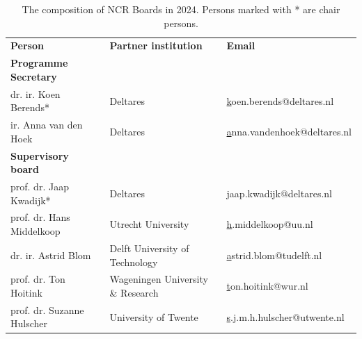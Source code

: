 \begin{longtable}{@{}lll@{}}
\caption{The composition of NCR Boards in 2024. Persons marked with * are chair persons.}\\


\rowcolor[HTML]{629194} 
{\color[HTML]{FFFFFF} \textbf{Person}} & {\color[HTML]{FFFFFF} \textbf{Partner   institution}} & {\color[HTML]{FFFFFF} \textbf{Email}}                        \\
\rowcolor[HTML]{C9D6D6} 
\textbf{Programme Secretary}           &                                                       &                                                              \\
\rowcolor[HTML]{B9C6D5} 
dr. ir. Koen Berends*                  & Deltares                                              & {\color[HTML]{0563C1} {\ul koen.berends@deltares.nl}}        \\
\rowcolor[HTML]{C9D6D6} 
ir. Anna van den Hoek                  & Deltares                                              & {\color[HTML]{0563C1} {\ul anna.vandenhoek@deltares.nl}}     \\
\rowcolor[HTML]{B9C6D5} 
\textbf{Supervisory board}             &                                                       &                                                              \\
\rowcolor[HTML]{C9D6D6} 
prof. dr. Jaap Kwadijk*                & Deltares                                              & {\color[HTML]{0563C1} {\ul jaap.kwadijk@deltares.nl}}        \\
\rowcolor[HTML]{B9C6D5} 
prof. dr. Hans Middelkoop              & Utrecht University                                    & {\color[HTML]{0563C1} {\ul h.middelkoop@uu.nl}}              \\
\rowcolor[HTML]{C9D6D6} 
dr. ir. Astrid Blom                    & Delft University of   Technology                      & {\color[HTML]{0563C1} {\ul astrid.blom@tudelft.nl}}          \\
\rowcolor[HTML]{B9C6D5} 
prof. dr. Ton  Hoitink                 & Wageningen University   \& Research                   & {\color[HTML]{0563C1} {\ul ton.hoitink@wur.nl}}              \\
\rowcolor[HTML]{C9D6D6} 
prof. dr. Suzanne Hulscher             & University of Twente                                  & {\color[HTML]{0563C1} {\ul s.j.m.h.hulscher@utwente.nl}}     \\

\end{longtable}
